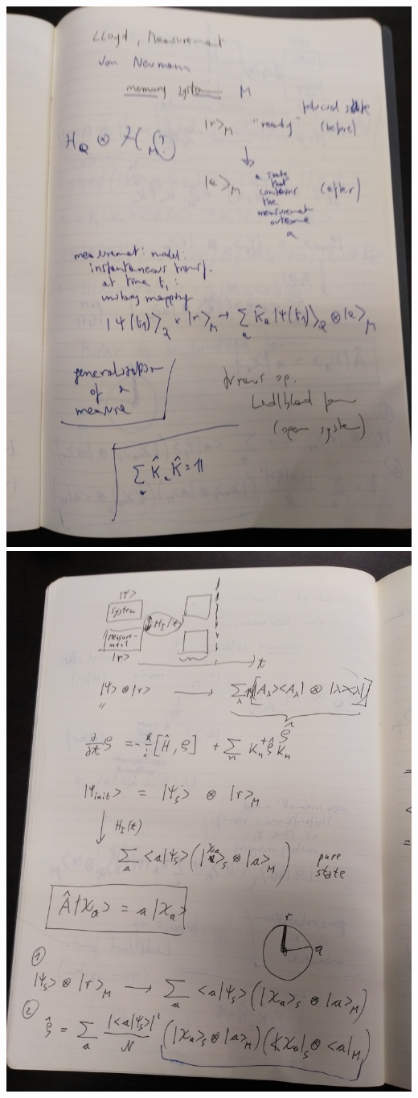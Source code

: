 \clearpage\includegraphics[width=\linewidth]{img/pw/qmem/1.jpg}
\clearpage\includegraphics[width=\linewidth]{img/pw/qmem/2.jpg}
